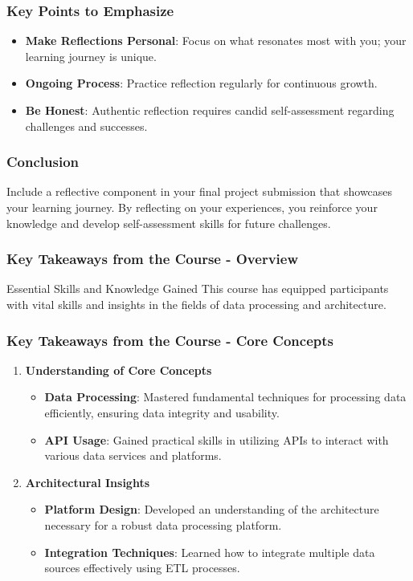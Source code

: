 \documentclass[aspectratio=169]{beamer}
\begin{document}
\begin{frame}[fragile]
  \frametitle{Key Points to Emphasize}
  \begin{itemize}
      \item \textbf{Make Reflections Personal}: Focus on what resonates most with you; your learning journey is unique.
      \item \textbf{Ongoing Process}: Practice reflection regularly for continuous growth.
      \item \textbf{Be Honest}: Authentic reflection requires candid self-assessment regarding challenges and successes.
  \end{itemize}
\end{frame}

\begin{frame}[fragile]
  \frametitle{Conclusion}
  Include a reflective component in your final project submission that showcases your learning journey.
  By reflecting on your experiences, you reinforce your knowledge and develop self-assessment skills for future challenges.
\end{frame}

\begin{frame}[fragile]
    \frametitle{Key Takeaways from the Course - Overview}
    \begin{block}{Essential Skills and Knowledge Gained}
        This course has equipped participants with vital skills and insights in the fields of data processing and architecture.
    \end{block}
\end{frame}

\begin{frame}[fragile]
    \frametitle{Key Takeaways from the Course - Core Concepts}
    \begin{enumerate}
        \item \textbf{Understanding of Core Concepts}
        \begin{itemize}
            \item \textbf{Data Processing}: Mastered fundamental techniques for processing data efficiently, ensuring data integrity and usability.
            \item \textbf{API Usage}: Gained practical skills in utilizing APIs to interact with various data services and platforms.
        \end{itemize}
    
        \item \textbf{Architectural Insights}
        \begin{itemize}
            \item \textbf{Platform Design}: Developed an understanding of the architecture necessary for a robust data processing platform.
            \item \textbf{Integration Techniques}: Learned how to integrate multiple data sources effectively using ETL processes.
        \end{itemize}
    \end{enumerate}
\end{frame}
\end{document}
